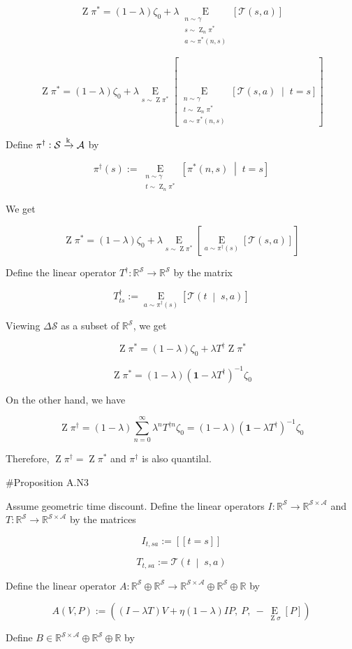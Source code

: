 \documentclass[a4paper]{article}
\newcommand{\AP}[1]{\left(#1\right)}
\newcommand{\AB}[1]{\left[#1\right]}
\newcommand{\APM}[2]{\left(#1\;\middle\vert\;#2\right)}
\newcommand{\ABM}[2]{\left[#1\;\middle\vert\;#2\right]}
\newcommand{\Ea}[2]{\underset{#1}{\operatorname{E}}\AB{#2}}
\newcommand{\CE}[3]{\underset{#1}{\operatorname{E}}\ABM{#2}{#3}}
\newcommand{\Reals}{\mathbb{R}}
\newcommand{\K}{\xrightarrow{\textnormal{k}}}
\newcommand{\A}{\mathcal{A}}
\newcommand{\St}{\mathcal{S}}
\newcommand{\T}{\mathcal{T}}
\DeclareMathOperator{\Z}{Z}
\begin{document}
$$\Z\pi^* = (1-\lambda)\zeta_0 + \lambda \Ea{\substack{n\sim\gamma\\s\sim\Z_n{\pi^*}\\a\sim\pi^*\AP{n,s}}}{\T(s,a)}$$

$$\Z\pi^* = (1-\lambda)\zeta_0 + \lambda \Ea{s\sim\Z\pi^*}{\CE{\substack{n\sim\gamma\\t\sim\Z_n\pi^*\\a\sim\pi^*(n,s)}}{\T(s,a)}{t=s}}$$

Define $\pi^\dagger: \St \K \A$ by

$$\pi^\dagger(s) := \CE{\substack{n\sim\gamma\\t\sim\Z_n\pi^*}}{\pi^*(n,s)}{t=s}$$

We get

$$\Z\pi^* = (1-\lambda)\zeta_0 + \lambda \Ea{s\sim\Z\pi^*}{\Ea{a\sim\pi^\dagger(s)}{\T(s,a)}}$$

Define the linear operator $T^\dagger: \Reals^\St \rightarrow \Reals^\St$ by the matrix 

$$T^\dagger_{ts} := \Ea{a\sim\pi^\dagger(s)}{\T\APM{t}{s,a}}$$

Viewing $\Delta\St$ as a subset of $\Reals^\St$, we get

$$\Z\pi^* = (1-\lambda)\zeta_0 + \lambda T^\dagger\Z\pi^*$$

$$\Z\pi^* = (1-\lambda)\AP{\boldsymbol{1}-\lambda T^\dagger}^{-1}\zeta_0$$

On the other hand, we have

$$\Z\pi^\dagger = (1-\lambda)\sum_{n=0}^\infty \lambda^n T^{\dagger n} \zeta_0 = (1-\lambda)\AP{\boldsymbol{1}-\lambda T^\dagger}^{-1}\zeta_0$$

Therefore, $\Z\pi^\dagger = \Z\pi^*$ and $\pi^\dagger$ is also quantilal.

\#Proposition A.N3

Assume geometric time discount. Define the linear operators $I: \Reals^\St \rightarrow \Reals^{\St\times\A}$ and $T: \Reals^\St \rightarrow \Reals^{\St\times\A}$ by the matrices

$$I_{t,sa}:=[[t=s]]$$

$$T_{t,sa}:=\T\APM{t}{s,a}$$

Define the linear operator $A: \Reals^\St \oplus \Reals^\St \rightarrow \Reals^{\St\times\A}\oplus\Reals^{\St}\oplus\Reals$ by

$$A(V,P):=\AP{\AP{I-\lambda T}V + \eta(1-\lambda)IP,\ P,\ -\Ea{\Z\sigma}{P}}$$

Define $B\in \Reals^{\St\times\A}\oplus\Reals^{\St}\oplus\Reals$ by
\end{document}
